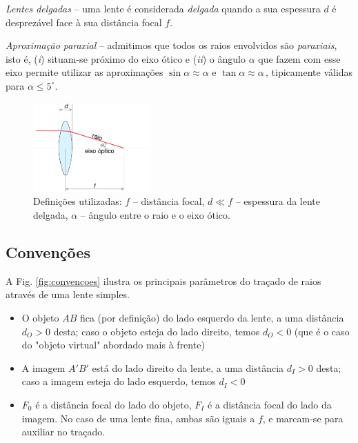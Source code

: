 \documentclass[12pt,a4paper,oneside]{paper}
\begin{document}
\emph{Lentes delgadas} -- uma lente é considerada \emph{delgada} quando a sua espessura $d$ é desprezável face à sua distância
focal $f$.

\emph{Aproximação paraxial} -- admitimos que todos os raios envolvidos são \emph{paraxiais}, isto é, (\emph{i}) situam-se
próximo do eixo ótico e (\emph{ii}) o ângulo $\alpha$ que fazem com esse eixo permite utilizar as aproximações
$\sin \alpha \approx \alpha$ e  $\tan \alpha \approx \alpha\,$, tipicamente válidas para $\alpha \leq  5^{\circ}$.

\begin{figure}[H]
	\centering 
	\includegraphics[width=0.4\textwidth]{./otica_images/2-definicoes}
 	\caption{\label{fig:fig2} Definições utilizadas: $f$ -- distância focal, $d\ll f$ -- espessura da lente delgada, $\alpha$ --
    ângulo entre o raio e o eixo ótico.} 
\end{figure}



\subsection{\sf Convenções}
A Fig. \ref{fig:convencoes} ilustra os principais parâmetros do traçado de raios através de uma lente simples.

\begin{itemize}
\item O objeto $AB$ fica (por definição) do lado esquerdo da lente, a uma distância $d_O>0$ desta; caso o objeto esteja
do lado direito, temos $d_O<0$ (que é o caso do "objeto virtual" abordado mais à frente)
\item A imagem $A'B'$ está do lado direito da lente, a uma distância $d_I>0$ desta; caso a imagem esteja do lado esquerdo,
temos $d_I<0$
\item $F_0$ é a distância focal do lado do objeto, $F_I$ é a distância focal do lado da imagem. No caso de uma lente fina,
ambas são iguais a $f$, e marcam-se para auxiliar no traçado.
\end{itemize}
\end{document}
